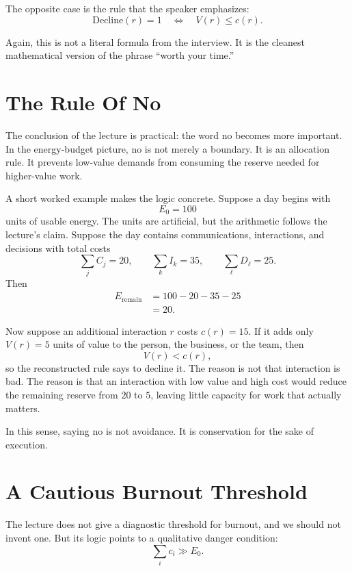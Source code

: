 The opposite case is the rule that the speaker emphasizes:
\begin{equation}
\mathrm{Decline}(r)=1
\quad \Longleftrightarrow \quad
V(r) \leq c(r).
\end{equation}

Again, this is not a literal formula from the interview. It is the cleanest mathematical version of the phrase ``worth your time.''

\section{The Rule Of No}

The conclusion of the lecture is practical: the word no becomes more important. In the energy-budget picture, no is not merely a boundary. It is an allocation rule. It prevents low-value demands from consuming the reserve needed for higher-value work.

A short worked example makes the logic concrete. Suppose a day begins with
\[
E_0 = 100
\]
units of usable energy. The units are artificial, but the arithmetic follows the lecture's claim. Suppose the day contains communications, interactions, and decisions with total costs
\[
\sum_j C_j = 20,
\qquad
\sum_k I_k = 35,
\qquad
\sum_{\ell} D_{\ell} = 25.
\]
Then
\begin{align}
E_{\mathrm{remain}}
&=
100 - 20 - 35 - 25 \\
&=
20.
\end{align}

Now suppose an additional interaction \(r\) costs \(c(r)=15\). If it adds only \(V(r)=5\) units of value to the person, the business, or the team, then
\[
V(r) < c(r),
\]
so the reconstructed rule says to decline it. The reason is not that interaction is bad. The reason is that an interaction with low value and high cost would reduce the remaining reserve from \(20\) to \(5\), leaving little capacity for work that actually matters.

In this sense, saying no is not avoidance. It is conservation for the sake of execution.

\section{A Cautious Burnout Threshold}

The lecture does not give a diagnostic threshold for burnout, and we should not invent one. But its logic points to a qualitative danger condition:
\begin{equation}
\sum_i c_i \gg E_0.
\end{equation}

